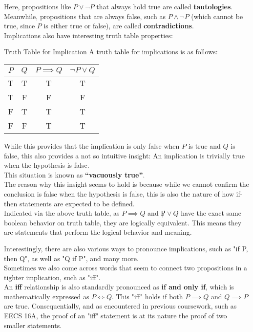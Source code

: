Here, propositions like $P \lor \neg P$ that always hold true are called \textbf{tautologies}. \\
Meanwhile, propositions that are always false, such as $P \land \neg P$ (which cannot be true, since $P$ is either true or false), are called \textbf{contradictions}. \\
Implications also have interesting truth table properties:
\begin{ln-fig}{Truth Table for Implication}{}
    A truth table for implications is as follows:
    \begin{center}
        \begin{tabular}{c c||c c}
            $P$ & $Q$ & $P \implies Q$ & $\neg P \lor Q$ \\
            \hline
            T & T & T & T \\
            \hline
            T & F & F & F\\
            \hline
            F & T & T & T\\
            \hline
            F & F & T & T
        \end{tabular}
    \end{center}
    While this provides that the implication is only false when $P$ is true and $Q$ is false, this also provides a not so intuitive insight: An implication is trivially true when the hypothesis is false. \\
    This situation is known as \textbf{``vacuously true''}. \\
    The reason why this insight seems to hold is because while we cannot confirm the conclusion is false when the hypothesis is false, this is also the nature of how if-then statements are expected to be defined. \\

    Indicated via the above truth table, as $P \implies Q$ and $\not P \lor Q$ have the exact same boolean behavior on truth table, they are logically equivalent. This means they are statements that perform the logical behavior and meaning.
\end{ln-fig}
Interestingly, there are also various ways to pronounce implications, such as "if P, then Q", as well as "Q if P", and many more. \\
Sometimes we also come across words that seem to connect two propositions in a tighter implication, such as "iff". \\
An \textbf{iff} relationship is also standardly pronounced as \textbf{if and only if}, which is mathematically expressed as $P \iff Q$. This "iff" holds if both $P \implies Q$ and $Q \implies P$ are true. Consequentially, and as encountered in previous coursework, such as EECS 16A, the proof of an "iff" statement is at its nature the proof of two smaller statements.

